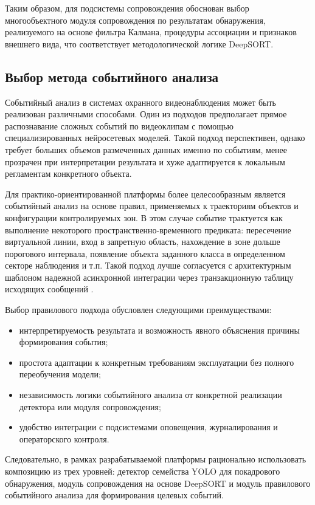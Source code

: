 Таким образом, для подсистемы сопровождения обоснован выбор многообъектного модуля сопровождения по результатам обнаружения, реализуемого на основе фильтра Калмана, процедуры ассоциации и признаков внешнего вида, что соответствует методологической логике DeepSORT.

\subsection{Выбор метода событийного анализа}

Событийный анализ в системах охранного видеонаблюдения может быть реализован различными способами. Один из подходов предполагает прямое распознавание сложных событий по видеоклипам с помощью специализированных нейросетевых моделей. Такой подход перспективен, однако требует больших объемов размеченных данных именно по событиям, менее прозрачен при интерпретации результата и хуже адаптируется к локальным регламентам конкретного объекта.

Для практико-ориентированной платформы более целесообразным является событийный анализ на основе правил, применяемых к траекториям объектов и конфигурации контролируемых зон. В этом случае событие трактуется как выполнение некоторого пространственно-временного предиката: пересечение виртуальной линии, вход в запретную область, нахождение в зоне дольше порогового интервала, появление объекта заданного класса в определенном секторе наблюдения и т.п. Такой подход лучше согласуется с архитектурным шаблоном надежной асинхронной интеграции через транзакционную таблицу исходящих сообщений \cite{transactional_outbox,richardson_microservices}.

Выбор правилового подхода обусловлен следующими преимуществами:
\begin{itemize}
    \item интерпретируемость результата и возможность явного объяснения причины формирования события;
    \item простота адаптации к конкретным требованиям эксплуатации без полного переобучения модели;
    \item независимость логики событийного анализа от конкретной реализации детектора или модуля сопровождения;
    \item удобство интеграции с подсистемами оповещения, журналирования и операторского контроля.
\end{itemize}

Следовательно, в рамках разрабатываемой платформы рационально использовать композицию из трех уровней: детектор семейства YOLO для покадрового обнаружения, модуль сопровождения на основе DeepSORT и модуль правилового событийного анализа для формирования целевых событий.

